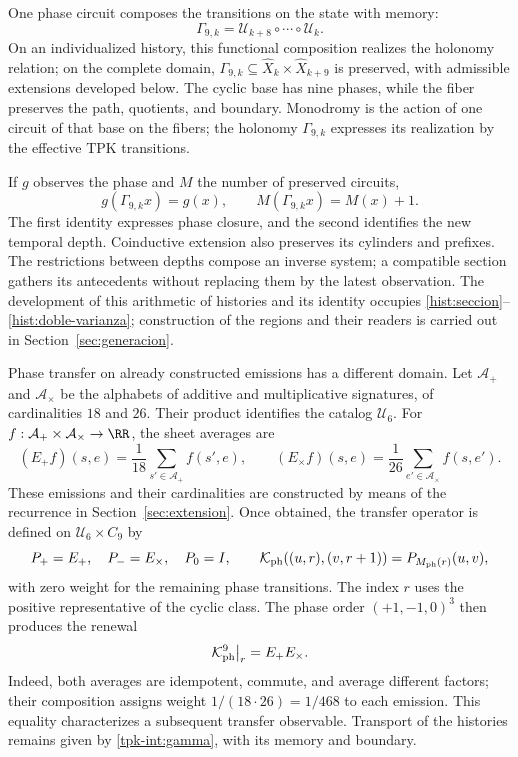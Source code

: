 One phase circuit composes the transitions on the state with memory:
\begin{equation}
 \Gamma_{9,k}=\mathcal U_{k+8}\circ\cdots\circ\mathcal U_k.
 \label{tpk-int:gamma}
\end{equation}
On an individualized history, this functional composition realizes
the holonomy relation; on the complete domain,
\(\Gamma_{9,k}\subseteq\widehat X_k\times\widehat X_{k+9}\) is preserved,
with admissible extensions developed below.
The cyclic base has nine phases, while
the fiber preserves the path, quotients, and boundary.
Monodromy is the action of one circuit of that base on the fibers; the
holonomy \(\Gamma_{9,k}\) expresses its realization by the effective
TPK transitions.

If \(g\) observes the phase and \(M\) the number of preserved circuits,
\[
 g(\Gamma_{9,k}x)=g(x),\qquad M(\Gamma_{9,k}x)=M(x)+1.
\]
The first identity expresses phase closure, and the second identifies
the new temporal depth. Coinductive extension also preserves
its cylinders and prefixes. The restrictions between depths
compose an inverse system; a compatible section gathers its
antecedents without replacing them by the latest observation. The development
of this arithmetic of histories and its identity occupies
\ref{hist:seccion}--\ref{hist:doble-varianza}; construction of the
regions and their readers is carried out in Section~\ref{sec:generacion}.

Phase transfer on already constructed emissions has a different
domain. Let \(\mathcal A_+\) and \(\mathcal A_\times\) be the
alphabets of additive and multiplicative signatures, of cardinalities \(18\)
and \(26\). Their product identifies the catalog \(\mathcal U_6\).
For \(f:\mathcal A_+\times\mathcal A_\times\to\RR\),
the sheet averages are
\[
 (E_+f)(s,e)=\frac1{18}\sum_{s'\in\mathcal A_+}f(s',e),\qquad
 (E_\times f)(s,e)=\frac1{26}\sum_{e'\in\mathcal A_\times}f(s,e').
\]
These emissions and their cardinalities are constructed by means of
the recurrence in Section~\ref{sec:extension}. Once obtained,
the transfer operator is defined on
\(\mathcal U_6\times C_9\) by
\[
 P_+=E_+,\quad P_-=E_\times,\quad P_0=I,\qquad
 \mathcal K_{\rm ph}((u,r),(v,r+1))=P_{M_{\rm ph}(r)}(u,v),
\]
with zero weight for the remaining phase transitions. The index
\(r\) uses the positive representative of the cyclic class.
The phase order \((+1,-1,0)^3\) then produces the renewal
\[
 \mathcal K_{\rm ph}^{9}\big|_r=E_+E_\times.
\]
Indeed, both averages are idempotent, commute, and average different
factors; their composition assigns weight \(1/(18\cdot26)=1/468\)
to each emission. This equality characterizes a subsequent transfer
observable. Transport of the histories remains given by
\eqref{tpk-int:gamma}, with its memory and boundary.

